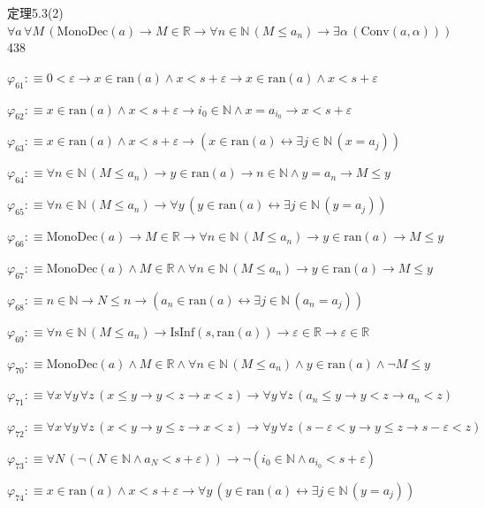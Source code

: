 \begin{fullproof}{定理5.3(2)}{$\forall a\,\forall M\,(\mathrm{MonoDec}(a) \to M \in \mathbb{R} \to \forall n \in \mathbb{N}\,(M \leq a_{n}) \to \exists \alpha\,(\mathrm{Conv}(a,\alpha)))$}{438}
\begin{abbrevlist}
\item $\varphi_{61} :\equiv 0 < \varepsilon \to x \in \mathrm{ran}(a) \land x < s + \varepsilon \to x \in \mathrm{ran}(a) \land x < s + \varepsilon$
\item $\varphi_{62} :\equiv x \in \mathrm{ran}(a) \land x < s + \varepsilon \to i_{0} \in \mathbb{N} \land x = a_{i_{0}} \to x < s + \varepsilon$
\item $\varphi_{63} :\equiv x \in \mathrm{ran}(a) \land x < s + \varepsilon \to (x \in \mathrm{ran}(a) \leftrightarrow \exists j \in \mathbb{N}\,(x = a_{j}))$
\item $\varphi_{64} :\equiv \forall n \in \mathbb{N}\,(M \leq a_{n}) \to y \in \mathrm{ran}(a) \to n \in \mathbb{N} \land y = a_{n} \to M \leq y$
\item $\varphi_{65} :\equiv \forall n \in \mathbb{N}\,(M \leq a_{n}) \to \forall y\,(y \in \mathrm{ran}(a) \leftrightarrow \exists j \in \mathbb{N}\,(y = a_{j}))$
\item $\varphi_{66} :\equiv \mathrm{MonoDec}(a) \to M \in \mathbb{R} \to \forall n \in \mathbb{N}\,(M \leq a_{n}) \to y \in \mathrm{ran}(a) \to M \leq y$
\item $\varphi_{67} :\equiv \mathrm{MonoDec}(a) \land M \in \mathbb{R} \land \forall n \in \mathbb{N}\,(M \leq a_{n}) \to y \in \mathrm{ran}(a) \to M \leq y$
\item $\varphi_{68} :\equiv n \in \mathbb{N} \to N \leq n \to (a_{n} \in \mathrm{ran}(a) \leftrightarrow \exists j \in \mathbb{N}\,(a_{n} = a_{j}))$
\item $\varphi_{69} :\equiv \forall n \in \mathbb{N}\,(M \leq a_{n}) \to \mathrm{IsInf}(s,\mathrm{ran}(a)) \to \varepsilon \in \mathbb{R} \to \varepsilon \in \mathbb{R}$
\item $\varphi_{70} :\equiv \mathrm{MonoDec}(a) \land M \in \mathbb{R} \land \forall n \in \mathbb{N}\,(M \leq a_{n}) \land y \in \mathrm{ran}(a) \land \neg M \leq y$
\item $\varphi_{71} :\equiv \forall x\,\forall y\,\forall z\,(x \leq y \to y < z \to x < z) \to \forall y\,\forall z\,(a_{n} \leq y \to y < z \to a_{n} < z)$
\item $\varphi_{72} :\equiv \forall x\,\forall y\,\forall z\,(x < y \to y \leq z \to x < z) \to \forall y\,\forall z\,(s - \varepsilon < y \to y \leq z \to s - \varepsilon < z)$
\item $\varphi_{73} :\equiv \forall N\,(\neg (N \in \mathbb{N} \land a_{N} < s + \varepsilon)) \to \neg (i_{0} \in \mathbb{N} \land a_{i_{0}} < s + \varepsilon)$
\item $\varphi_{74} :\equiv x \in \mathrm{ran}(a) \land x < s + \varepsilon \to \forall y\,(y \in \mathrm{ran}(a) \leftrightarrow \exists j \in \mathbb{N}\,(y = a_{j}))$

\end{abbrevlist}
\end{fullproof}
